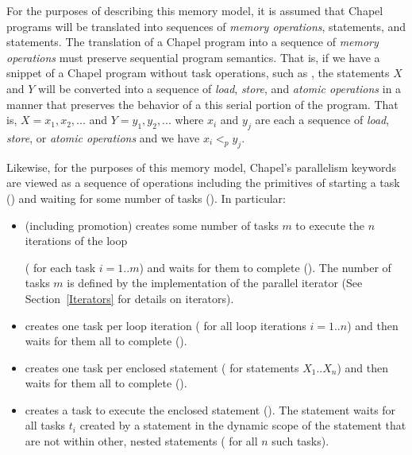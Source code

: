 For the purposes of describing this memory model, it is assumed that Chapel
programs will be translated into sequences of \textit{memory operations},
 statements, and  statements. The translation of a
Chapel program into a sequence of \textit{memory operations} must
preserve sequential program semantics. That is, if we have a snippet
of a Chapel program without task operations, such as , the
statements $X$ and $Y$ will be converted into a sequence
of \textit{load}, \textit{store}, and \textit{atomic operations} in a
manner that preserves the behavior of a this serial portion of the
program. That is, $X=x_1,x_2,...$ and $Y=y_1,y_2,...$ where $x_i$ and
$y_j$ are each a sequence of \textit{load}, \textit{store},
or \textit{atomic operations} and we have $x_i <_p y_j$.

Likewise, for the purposes of this memory model, Chapel's parallelism
keywords are viewed as a sequence of operations including the
primitives of starting a task () and waiting for some
number of tasks (). In particular:

\begin{itemize}

  \item {} (including promotion) creates some number of
tasks $m$ to execute the $n$ iterations of the loop

( for each task $i=1$..$m$) 
and waits for
them to complete ().  The number of tasks $m$
is defined by the implementation of the parallel iterator (See
Section~\ref{Iterators} for details on iterators).

  \item {} creates one task per loop iteration
( for all loop iterations $i=1..n$)
and then waits for them all to complete ().

  \item {} creates one task per enclosed statement
( for statements $X_1$..$X_n$) and then
waits for them all to complete ().

  \item {} creates a task to execute the enclosed statement
().  The  statement waits for all
tasks $t_i$ created by a  statement in the dynamic scope of the
 statement that are not within other, nested 
statements ( for all $n$ such tasks).

\end{itemize}

